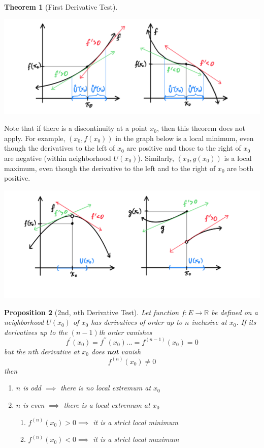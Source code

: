 \documentclass{article}
\newtheorem{theorem}{Theorem}[section]
\newtheorem{proposition}[theorem]{Proposition}
\theoremstyle{remark}
\theoremstyle{definition}
\begin{document}
\begin{theorem}[First Derivative Test]
\begin{enumerate}
    \begin{center}
        \includegraphics[scale=0.28]{img/No_Extremum.PNG}
    \end{center}
\end{enumerate}
\end{theorem}

Note that if there is a discontinuity at a point $x_0$, then this theorem does not apply. For example, $(x_0, f(x_0))$ in the graph below is a local minimum, even though the derivatives to the left of $x_0$ are positive and those to the right of $x_0$ are negative (within neighborhood $U(x_0)$). Similarly, $(x_0, g(x_0))$ is a local maximum, even though the derivative to the left and to the right of $x_0$ are both positive. 
\begin{center}
    \includegraphics[scale=0.3]{img/Theorem_not_apply_if_Discontinuity.PNG}
\end{center}

\begin{proposition}[2nd, $n$th Derivative Test]
Let function $f: E \longrightarrow \mathbb{R}$ be defined on a neighborhood $U(x_0)$ of $x_0$ has derivatives of order up to $n$ inclusive at $x_0$. If its derivatives up to the $(n-1)$th order vanishes 
\[f^\prime (x_0) = f^{\prime\prime} (x_0) ... = f^{(n-1)} (x_0) = 0\]
but the $n$th derivative at $x_0$ does \textbf{not} vanish
\[f^{(n)} (x_0) \neq 0\]
then 
\begin{enumerate}
    \item $n$ is odd $\implies$ there is no local extremum at $x_0$ 
    \item $n$ is even $\implies$ there is a local extremum at $x_0$
    \begin{enumerate}
        \item $f^{(n)} (x_0) > 0 \implies$ it is a strict local minimum
        \item $f^{(n)} (x_0) < 0 \implies$ it is a strict local maximum
    \end{enumerate}
\end{enumerate}
\end{proposition}
\end{document}
